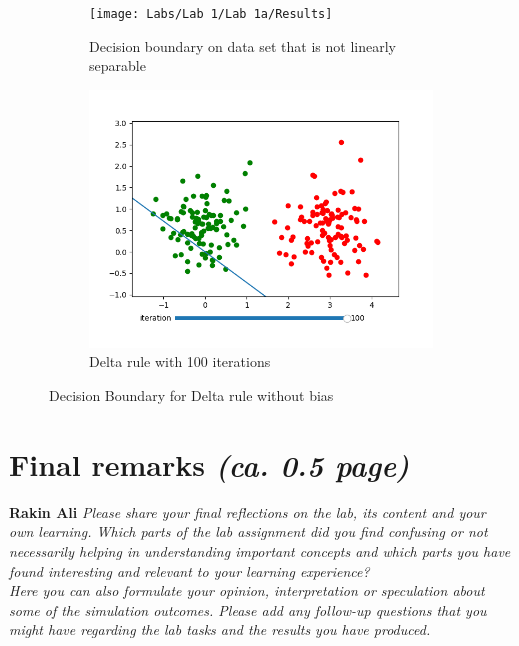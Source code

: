 \documentclass[a4paper]{article}
\begin{document}
\begin{figure}[htb]
    \centering
    \begin{subfigure}{0.4\textwidth}
        \texttt{[image: Labs/Lab 1/Lab 1a/Results]}
        \caption{Decision boundary on data set that is not linearly separable}
        \label{fig:Decision-boundary-not-linearly-separable}
    \end{subfigure}
    \hfill
    \begin{subfigure}{0.4\textwidth}
        \includegraphics[width=\textwidth]{Labs/Lab 1/Lab 1a/Results/Delta-linear-seperable-NO-BIAS-ITERATION100.png}
        \caption{Delta rule with 100 iterations}
        \label{fig:Perceptron}
    \end{subfigure}
    \caption{Decision Boundary for Delta rule without bias }
    \label{fig:DeltaRule-NoBias}
\end{figure}


\section{Final remarks \normalsize{\textit{(ca. 0.5 page)}}} \textbf{Rakin Ali }
\textit{Please share your final reflections on the lab, its content and your own learning. Which parts of the lab assignment did you find confusing or not necessarily helping in understanding important concepts and which parts you have found interesting and relevant to your learning experience? \\
Here you can also formulate your opinion, interpretation or speculation about some of the simulation outcomes. Please add any follow-up questions that you might have regarding the lab tasks and the results you have produced.}
\end{document}
